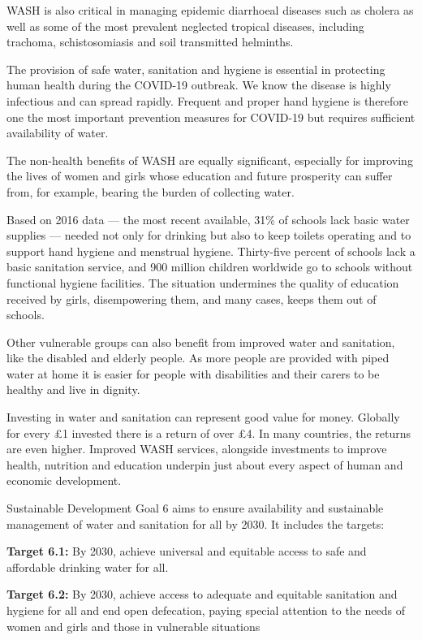 WASH is also critical in managing epidemic diarrhoeal diseases such as cholera as well as some of the most prevalent neglected tropical diseases, including trachoma, schistosomiasis and soil transmitted helminths. %

The provision of safe water, sanitation and hygiene is essential in protecting human health during the COVID-19 outbreak. %
We know the disease is highly infectious and can spread rapidly. %
Frequent and proper hand hygiene is therefore one the most important prevention measures for COVID-19 but requires sufficient availability of water. %

The non-health benefits of WASH are equally significant, especially for improving the lives of women and girls whose education and future prosperity can suffer from, for example, bearing the burden of collecting water. %

Based on 2016 data --- the most recent available, 31\% of schools lack basic water supplies --- needed not only for drinking but also to keep toilets operating and to support hand hygiene and menstrual hygiene. %
Thirty-five percent of schools lack a basic sanitation service, and 900 million children worldwide go to schools without functional hygiene facilities. %
The situation undermines the quality of education received by girls, disempowering them, and many cases, keeps them out of schools. %

Other vulnerable groups can also benefit from improved water and sanitation, like the disabled and elderly people. %
As more people are provided with piped water at home it is easier for people with disabilities and their carers to be healthy and live in dignity. %

Investing in water and sanitation can represent good value for money. %
Globally for every \pounds 1 invested there is a return of over \pounds 4. %
In many countries, the returns are even higher. %
Improved WASH services, alongside investments to improve health, nutrition and education underpin just about every aspect of human and economic development. %

Sustainable Development Goal 6 aims to ensure availability and sustainable management of water and sanitation for all by 2030. It includes the targets:

\begin{adjustwidth}{0.5cm}{}
\textbf{Target 6.1:} By 2030, achieve universal and equitable access to safe and affordable drinking water for all.

\medskip

\noindent\textbf{Target 6.2:} By 2030, achieve access to adequate and equitable sanitation and hygiene for all and end open defecation, paying special attention to the needs of women and girls and those in vulnerable situations
\end{adjustwidth}

